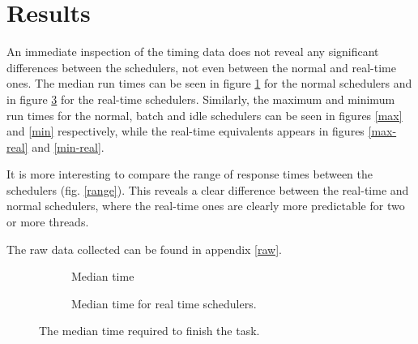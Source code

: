 \documentclass[12pt, a4paper]{article} %
\begin{document}
\section{Results}

An immediate inspection of the timing data does not reveal any significant differences between the schedulers, not even between the normal and real-time ones.
The median run times can be seen in figure \ref{median} for the normal schedulers and in figure \ref{median-real} for the real-time schedulers.
Similarly, the maximum and minimum run times for the normal, batch and idle schedulers can be seen in figures \ref{max} and \ref{min} respectively, while the real-time equivalents appears in figures \ref{max-real} and \ref{min-real}.

It is more interesting to compare the range of response times between the schedulers (fig. \ref{range}).
This reveals a clear difference between the real-time and normal schedulers, where the real-time ones are clearly more predictable for two or more threads.

The raw data collected can be found in appendix \ref{raw}.

\begin{figure}
	\centering
	\begin{subfigure}[t]{0.8\textwidth}
		\caption{Median time}
		\label{median}
	\end{subfigure}
	
	\begin{subfigure}[t]{0.8\textwidth}
		\caption{Median time for real time schedulers.}
		\label{median-real}
	\end{subfigure}
	\caption{The median time required to finish the task.}
\end{figure}
\end{document}
